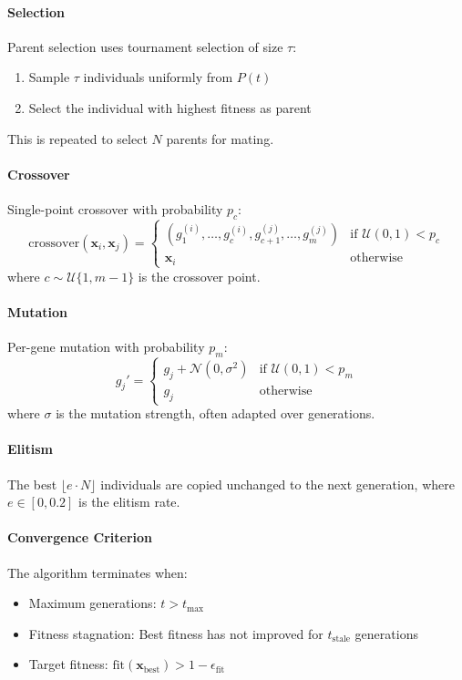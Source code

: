 \documentclass{report}
\begin{document}
\paragraph{Selection}
Parent selection uses tournament selection of size $\tau$:
\begin{enumerate}
\item Sample $\tau$ individuals uniformly from $P(t)$
\item Select the individual with highest fitness as parent
\end{enumerate}
This is repeated to select $N$ parents for mating.

\paragraph{Crossover}
Single-point crossover with probability $p_c$:
\begin{equation}
\text{crossover}(\mathbf{x}_i, \mathbf{x}_j) = \begin{cases}
(g_1^{(i)}, \ldots, g_c^{(i)}, g_{c+1}^{(j)}, \ldots, g_m^{(j)}) & \text{if } \mathcal{U}(0,1) < p_c \\
\mathbf{x}_i & \text{otherwise}
\end{cases}
\end{equation}
where $c \sim \mathcal{U}\{1, m-1\}$ is the crossover point.

\paragraph{Mutation}
Per-gene mutation with probability $p_m$:
\begin{equation}
g_j' = \begin{cases}
g_j + \mathcal{N}(0, \sigma^2) & \text{if } \mathcal{U}(0,1) < p_m \\
g_j & \text{otherwise}
\end{cases}
\end{equation}
where $\sigma$ is the mutation strength, often adapted over generations.

\paragraph{Elitism}
The best $\lfloor e \cdot N \rfloor$ individuals are copied unchanged to the next generation, where $e \in [0, 0.2]$ is the elitism rate.

\paragraph{Convergence Criterion}
The algorithm terminates when:
\begin{itemize}
\item Maximum generations: $t > t_{\max}$
\item Fitness stagnation: Best fitness has not improved for $t_{\text{stale}}$ generations
\item Target fitness: $\text{fit}(\mathbf{x}_{\text{best}}) > 1 - \epsilon_{\text{fit}}$
\end{itemize}
\end{document}
